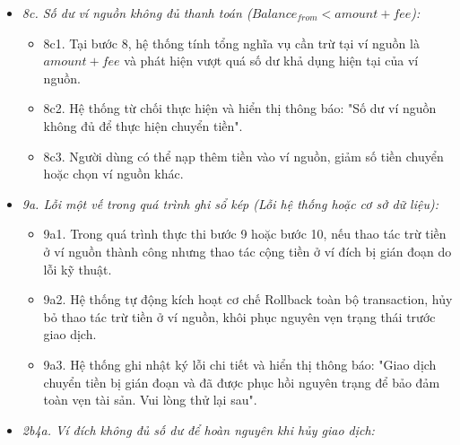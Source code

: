 \documentclass[11pt,a4paper]{article}
\providecommand{\tightlist}{
  \setlength{\itemsep}{0pt}\setlength{\parskip}{0pt}}
\begin{document}
\begin{itemize}
\begin{itemize}
    \begin{itemize}
    \tightlist
    \item
      8b1. Tại bước 8, hệ thống phát hiện số tiền chuyển nhập vào
      \(\le 0\).
    \item
      8b2. Hệ thống thông báo: "Số tiền chuyển phải là một số dương lớn
      hơn 0".
    \item
      8b3. Người dùng nhập lại số tiền hợp lệ.
    \end{itemize}
  \item
    \emph{8c. Số dư ví nguồn không đủ thanh toán
    (\(Balance_{from} < amount + fee\)):}

    \begin{itemize}
    \tightlist
    \item
      8c1. Tại bước 8, hệ thống tính tổng nghĩa vụ cần trừ tại ví nguồn
      là \(amount + fee\) và phát hiện vượt quá số dư khả dụng hiện tại
      của ví nguồn.
    \item
      8c2. Hệ thống từ chối thực hiện và hiển thị thông báo: "Số dư ví
      nguồn không đủ để thực hiện chuyển tiền".
    \item
      8c3. Người dùng có thể nạp thêm tiền vào ví nguồn, giảm số tiền
      chuyển hoặc chọn ví nguồn khác.
    \end{itemize}
  \item
    \emph{9a. Lỗi một vế trong quá trình ghi sổ kép (Lỗi hệ thống hoặc
    cơ sở dữ liệu):}

    \begin{itemize}
    \tightlist
    \item
      9a1. Trong quá trình thực thi bước 9 hoặc bước 10, nếu thao tác
      trừ tiền ở ví nguồn thành công nhưng thao tác cộng tiền ở ví đích
      bị gián đoạn do lỗi kỹ thuật.
    \item
      9a2. Hệ thống tự động kích hoạt cơ chế Rollback toàn bộ
      transaction, hủy bỏ thao tác trừ tiền ở ví nguồn, khôi phục nguyên
      vẹn trạng thái trước giao dịch.
    \item
      9a3. Hệ thống ghi nhật ký lỗi chi tiết và hiển thị thông báo:
      "Giao dịch chuyển tiền bị gián đoạn và đã được phục hồi nguyên
      trạng để bảo đảm toàn vẹn tài sản. Vui lòng thử lại sau".
    \end{itemize}
  \item
    \emph{2b4a. Ví đích không đủ số dư để hoàn nguyên khi hủy giao
    dịch:}


\end{itemize}
\end{itemize}
\end{document}

